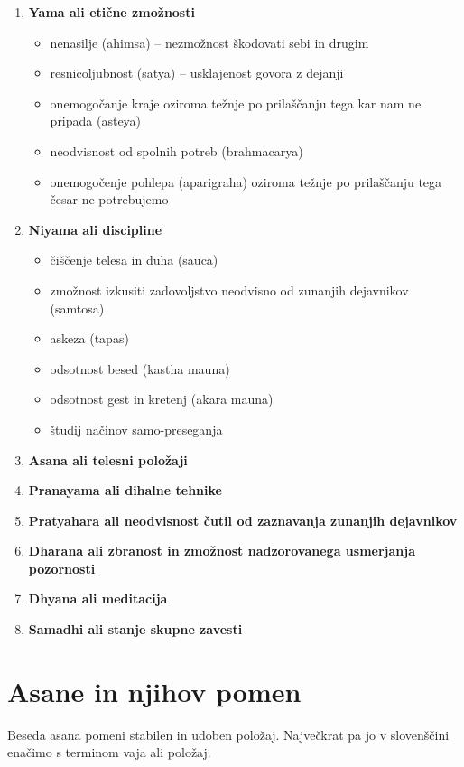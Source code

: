 \documentclass[a4paper, 12pt]{book}
\begin{document}
\begin{enumerate}
	\item \textbf{Yama ali etične zmožnosti} 
		\begin{itemize}
			\item nenasilje (ahimsa) – nezmožnost škodovati sebi in drugim
			\item resnicoljubnost (satya) – usklajenost govora z dejanji
			\item onemogočanje kraje oziroma težnje po prilaščanju tega kar nam ne pripada (asteya)
			\item neodvisnost od spolnih potreb (brahmacarya)
			\item onemogočenje pohlepa (aparigraha) oziroma težnje po prilaščanju tega česar ne potrebujemo
		\end{itemize}
	
	\item \textbf{Niyama ali discipline}
		\begin{itemize}
			\item čiščenje telesa in duha (sauca)
			\item zmožnost izkusiti zadovoljstvo neodvisno od zunanjih dejavnikov (samtosa)
			\item askeza (tapas)
			\item odsotnost besed (kastha mauna)
			\item odsotnost gest in kretenj (akara mauna)
			\item študij načinov samo-preseganja
		\end{itemize}

	\item \textbf{Asana ali telesni položaji}
	\item \textbf{Pranayama ali dihalne tehnike}
	\item \textbf{Pratyahara ali neodvisnost čutil od zaznavanja zunanjih dejavnikov}
	\item \textbf{Dharana ali zbranost in zmožnost nadzorovanega usmerjanja pozornosti}
	\item \textbf{Dhyana ali meditacija}
	\item \textbf{Samadhi ali stanje skupne zavesti}
\end{enumerate}


\section{Asane in njihov pomen}
Beseda asana pomeni stabilen in udoben položaj. Največkrat pa jo v slovenščini enačimo s terminom vaja ali položaj.\\ 
\end{document}
